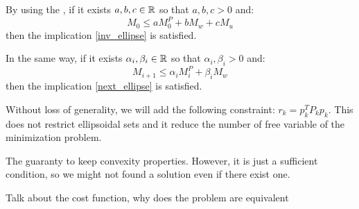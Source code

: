 By using the \Sproc{}, if it exists $a,b,c \in \mathbb{R}$ so that $a,b,c>0$ and:
\begin{equation}
M_0 \leq a M^P_0 + b M_w + c M_u
\end{equation}
then the implication \ref{inv_ellipse} is satisfied.

\newcommand{\ai}{\alpha_i}
\newcommand{\bi}{\beta_i}
In the same way, if it exists $\ai,\bi \in \R$ so that $\ai,\bi>0$ and:
\begin{equation}
M_{i+1} \leq \ai M^P_i + \bi M_w
\end{equation}
then the implication \ref{next_ellipse} is satisfied.

Without loss of generality, we will add the following constraint: $r_k = p_k^T P_k p_k$. This does not restrict ellipsoidal sets and it reduce the number of free variable of the minimization problem.

The \Sproc{} guaranty to keep convexity properties. However, it is just a sufficient condition, so we might not found a solution even if there exist one.

Talk about the cost function, why does the problem are equivalent

\cite{Polyak200815349}
\cite{LMI_book}
